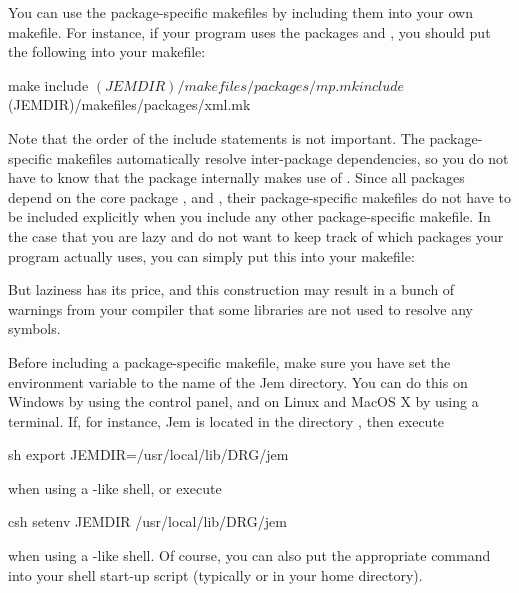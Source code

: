 \documentclass[a4paper,10pt]{article}
\begin{document}
You can use the package-specific makefiles by including them into your
own makefile. For instance, if your program uses the packages
 and , you should put the following into your
makefile:
\begin{Source}{make}
  include $(JEMDIR)/makefiles/packages/mp.mk
  include $(JEMDIR)/makefiles/packages/xml.mk
\end{Source}
Note that the order of the include statements is not important. The
package-specific makefiles automatically resolve inter-package
dependencies, so you do not have to know that the package 
internally makes use of . Since all packages depend on
the core package ,  and , their
package-specific makefiles do not have to be included explicitly when you
include any other package-specific makefile. In the case that you are
lazy and do not want to keep track of which packages your program
actually uses, you can simply put this into your makefile:
But laziness has its price, and this construction may result in a
bunch of warnings from your compiler that some libraries are not used
to resolve any symbols.

Before including a package-specific makefile, make sure you have set the
environment variable  to the name of the Jem directory. You
can do this on Windows by using the control panel, and on Linux and MacOS
X by using a terminal. If, for instance, Jem is located in the
directory , then execute
\begin{Source}{sh}
  export JEMDIR=/usr/local/lib/DRG/jem
\end{Source}
when using a -like shell, or execute
\begin{Source}{csh}
  setenv JEMDIR /usr/local/lib/DRG/jem
\end{Source}
when using a -like shell. Of course, you can also put the
appropriate command into your shell start-up script (typically
 or  in your home directory).
\end{document}
